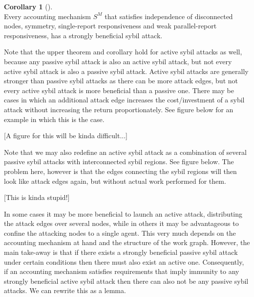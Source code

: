 \documentclass[11pt,a4paper]{article}
\theoremstyle{definition}
\theoremstyle{theorem}
\theoremstyle{proposition}
\theoremstyle{corollary}
\newtheorem{corollary}{Corollary}[section]
\theoremstyle{lemma}
\theoremstyle{example}
\theoremstyle{remark}
\begin{document}
\begin{corollary}[]\ \\
Every accounting mechanism $S^M$ that satisfies independence of disconnected nodes, symmetry, single-report responsiveness and weak parallel-report responsiveness, has a strongly beneficial sybil attack.
\end{corollary}

\noindent{}Note that the upper theorem and corollary hold for active sybil attacks as well, because any passive sybil attack is also an active sybil attack, but not every active sybil attack is also a passive sybil attack. Active sybil attacks are generally stronger than passive sybil attacks as there can be more attack edges, but not every active sybil attack is more beneficial than a passive one. There may be cases in which an additional attack edge increases the cost/investment of a sybil attack without increasing the return proportionately. See figure below for an example in which this is the case. \begin{center} [A figure for this will be kinda difficult...] \vspace{1em}\\ \end{center}

\noindent{}Note that we may also redefine an active sybil attack as a combination of several passive sybil attacks with interconnected sybil regions. See figure below. The problem here, however is that the edges connecting the sybil regions will then look like attack edges again, but without actual work performed for them. \begin{center}[This is kinda stupid!]\vspace{1em}\\ \end{center}

\noindent{}In some cases it may be more beneficial to launch an active attack, distributing the attack edges over several nodes, while in others it may be advantageous to confine the attacking nodes to a single agent. This very much depends on the accounting mechanism at hand and the structure of the work graph. However, the main take-away is that if there exists a strongly beneficial passive sybil attack under certain conditions then there must also exist an active one. Consequently, if an accounting mechanism satisfies requirements that imply immunity to any strongly beneficial active sybil attack then there can also not be any passive sybil attacks. We can rewrite this as a lemma. \vspace{1em}\\
\end{document}
